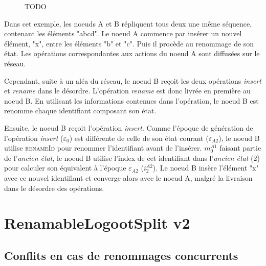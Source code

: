 \documentclass[12pt]{thesul}
\newcommand{\trm}[1]{\mathit{#1}}
\newcommand{\id}[3]{$\trm{#1}^{\trm{#2}}_{\trm{#3}}$}
\newcommand{\epoch}[1]{$\varepsilon_{#1}$}
\begin{document}
\begin{figure}[!ht]
{
  }
  \caption{TODO}
  \label{fig:rls-out-of-order-rename}
\end{figure}

Dans cet exemple, les noeuds A et B répliquent tous deux une même séquence, contenant les éléments "abcd".
Le noeud A commence par insérer un nouvel élément, "x", entre les éléments "b" et "c".
Puis il procède au renommage de son état.
Les opérations correspondantes aux actions du noeud A sont diffusées sur le réseau.

Cependant, suite à un aléa du réseau, le noeud B reçoit les deux opérations \emph{insert} et \emph{rename} dans le désordre.
L'opération \emph{rename} est donc livrée en première au noeud B.
En utilisant les informations contenues dans l'opération, le noeud B est renomme chaque identifiant composant son état.

Ensuite, le noeud B reçoit l'opération \emph{insert}.
Comme l'époque de génération de l'opération \emph{insert} (\epoch{0}) est différente de celle de son état courant (\epoch{A2}), le noeud B utilise \textsc{renameId} pour renommer l'identifiant avant de l'insérer.
\id{m}{A1}{0} faisant partie de l'\emph{ancien état}, le noeud B utilise l'index de cet identifiant dans l'\emph{ancien état} (2) pour calculer son équivalent à l'époque \epoch{A2} (\id{i}{A2}{2}).
Le noeud B insère l'élément "x" avec ce nouvel identifiant et converge alors avec le noeud A, malgré la livraison dans le désordre des opérations.

\section{RenamableLogootSplit v2}
\label{sec:distributed-rls}
\subsection{Conflits en cas de renommages concurrents}
\end{document}
